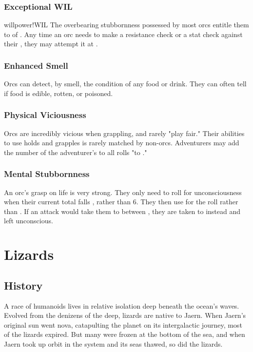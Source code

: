 \begin{multicols*}{2}
\subsubsection{Exceptional WIL}
{willpower!WIL}
The overbearing stubbornness possessed by most orcs entitle them to  of . Any time an orc needs to make a resistance check or a stat check against
their \WIL, they may attempt it at .
\subsubsection{Enhanced Smell}
Orcs can detect, by smell, the condition of any food or drink. They can often tell if food is edible, rotten, or poisoned.
\subsubsection{Physical Viciousness}
Orcs are incredibly vicious when grappling, and rarely "play fair." Their abilities to use holds and grapples is rarely matched by non-orcs. Adventurers may add the number of the adventurer's  to all rolls "to ."
\subsubsection{Mental Stubbornness}
An orc's grasp on life is very strong. They only need to roll for unconsciousness when their current \DP total falls , rather than 6. They then use  for the roll rather than . If an attack would take them to between , they are taken to \result{0 \DP} instead and left unconscious.
\makeline
\section{Lizards}
\subsection{History}
A race of humanoids lives in relative isolation deep beneath the ocean's waves. Evolved from the denizens of the deep, lizards are native to Jaern. When Jaern's original sun went nova, catapulting the planet on its intergalactic journey, most of the lizards expired. But many were frozen at the bottom of the sea, and when Jaern took up orbit in the  system and its seas thawed, so did the lizards.

\end{multicols*}
